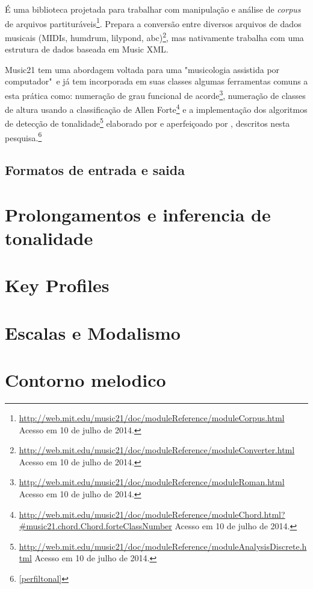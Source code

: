 \documentclass[
	12pt,				%
	openright,			%
	twoside,			%
	a4paper,			%
	english,			%
	french,				%
	spanish,			%
	brazil				%
	]{abntex2}
\begin{document}
É uma biblioteca projetada para trabalhar com manipulação e análise de \textit{corpus} de arquivos partituráveis\footnote{\url{http://web.mit.edu/music21/doc/moduleReference/moduleCorpus.html} Acesso em 10 de julho de 2014.}. Prepara a conversão entre diversos arquivos de dados musicais (MIDIs, humdrum, lilypond, abc)\footnote{\url{http://web.mit.edu/music21/doc/moduleReference/moduleConverter.html} Acesso em 10 de julho de 2014.}, mas nativamente trabalha com uma estrutura de dados baseada em Music XML.

Music21 tem uma abordagem voltada para uma "musicologia assistida por computador"\ e já tem incorporada em suas classes algumas ferramentas comuns a esta prática como: numeração de grau funcional de acorde\footnote{\url{http://web.mit.edu/music21/doc/moduleReference/moduleRoman.html} Acesso em 10 de julho de 2014.}, numeração de classes de altura usando a classificação de Allen Forte\footnote{\url{http://web.mit.edu/music21/doc/moduleReference/moduleChord.html?\#music21.chord.Chord.forteClassNumber} Acesso em 10 de julho de 2014.} e a implementação dos algoritmos de detecção de tonalidade\footnote{\url{http://web.mit.edu/music21/doc/moduleReference/moduleAnalysisDiscrete.html} Acesso em 10 de julho de 2014.} elaborado por  e aperfeiçoado por , descritos nesta pesquisa.\footnote{\autoref{perfiltonal}}

\subsection{Formatos de entrada e saida}

\section{Prolongamentos e inferencia de tonalidade}

\section{Key Profiles}

\section{Escalas e Modalismo}





\section{Contorno melodico}
\end{document}

